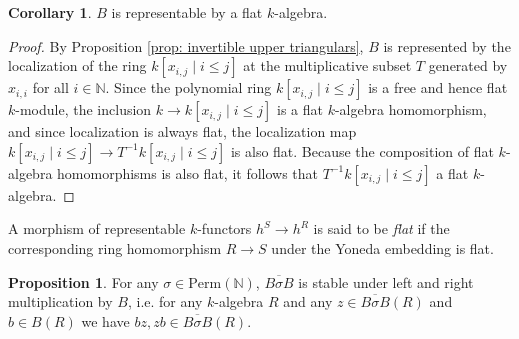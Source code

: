 \documentclass[oneside,11pt]{amsart}
\newcommand{\nn}{\ensuremath{\mathbb{N}}}
\newcommand{\Perm}{\ensuremath{\text{Perm}}}
\theoremstyle{definition}
\newtheorem{proof techniques}{Proof Techniques}
\newtheorem{corollary}{Corollary}
\newtheorem{proposition}{Proposition}
\begin{document}


\begin{corollary}\label{cor: B represented by a flat algebra}
$B$ is representable by a flat $k$-algebra.  
\end{corollary}

\begin{proof}
By Proposition \ref{prop: invertible upper triangulars}, $B$ is represented by the localization of the ring $k[x_{i , j} \mid i \leq j ]$ at the multiplicative subset $T$ generated by $x_{i , i}$ for all $i \in \nn$. Since the polynomial ring $k[x_{i , j} \mid i \leq j ]$ is a free and hence flat $k$-module, the inclusion $k \to k[x_{i , j} \mid i \leq j ]$ is a flat $k$-algebra homomorphism, and since localization is always flat, the localization map $k[x_{i , j} \mid i \leq j ] \to T^{-1} k[x_{i , j} \mid i \leq j ]$ is also flat. Because the composition of flat $k$-algebra homomorphisms is also flat, it follows that $T^{-1} k[x_{i , j} \mid i \leq j ]$ a flat $k$-algebra. 
\end{proof}


A morphism of representable $k$-functors $h^S \to h^R$ is said to be \emph{flat} if the corresponding ring homomorphism $R \to S$ under the Yoneda embedding is flat.


\begin{proposition}
For any $\sigma \in \Perm(\nn)$, $\overline{B \sigma B}$ is stable under left and right multiplication by $B$, i.e. for any $k$-algebra $R$ and any $z \in \overline{B \sigma B}(R)$ and $b \in B(R)$ we have $b z , z b \in \overline{B \sigma B}(R)$. 
\end{proposition}
\end{document}

